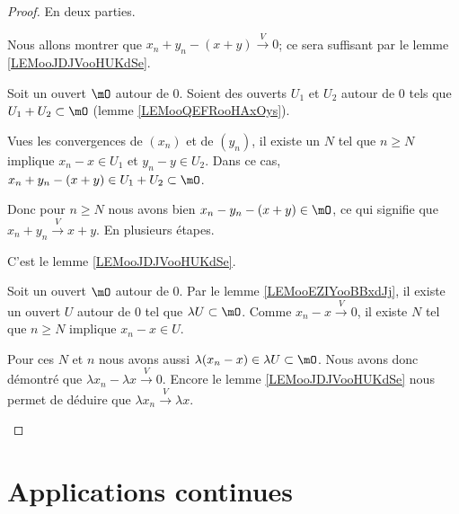 \begin{proof}
	En deux parties.
	\begin{subproof}
		\spitem[\ref{ITEMooSHPAooQyEkgT}]
		Nous allons montrer que \( x_n+y_n-(x+y)\stackrel{V}{\longrightarrow}0\); ce sera suffisant par le lemme \ref{LEMooJDJVooHUKdSe}.

		Soit un ouvert \( \mO\) autour de \( 0\). Soient des ouverts \( U_1\) et \( U_2\) autour de \( 0\) tels que \( U_1+U_2\subset \mO\) (lemme \ref{LEMooQEFRooHAxOys}).

		Vues les convergences de \( (x_n)\) et de \( (y_n)\), il existe un \( N\) tel que \( n\geq N\) implique \( x_n-x\in U_1\) et \( y_n-y\in U_2\). Dans ce cas, \( x_n+y_n-(x+y)\in U_1+U_2\subset \mO\).

		Donc pour \( n\geq N\) nous avons bien \( x_n-y_n-(x+y)\in \mO\), ce qui signifie que \( x_n+y_n\stackrel{V}{\longrightarrow}x+y\).
		\spitem[\ref{ITEMooYHHYooYATzWE}]
		En plusieurs étapes.
		\begin{subproof}
			C'est le lemme \ref{LEMooJDJVooHUKdSe}.

			Soit un ouvert \( \mO\) autour de \( 0\). Par le lemme \ref{LEMooEZIYooBBxdJj}, il existe un ouvert \( U\) autour de \( 0\) tel que \( \lambda U\subset \mO\). Comme \( x_n-x\stackrel{V}{\longrightarrow}0\), il existe \( N\) tel que \( n\geq N\) implique \( x_n-x\in U\).

			Pour ces \( N\) et \( n\) nous avons aussi \( \lambda (x_n-x)\in \lambda U\subset \mO\). Nous avons donc démontré que \( \lambda x_n-\lambda x\stackrel{V}{\longrightarrow}0\).
			\spitem[Conclusion]
			Encore le lemme \ref{LEMooJDJVooHUKdSe} nous permet de déduire que \( \lambda x_n\stackrel{V}{\longrightarrow}\lambda x\).
		\end{subproof}
	\end{subproof}
\end{proof}

\section{Applications continues}

